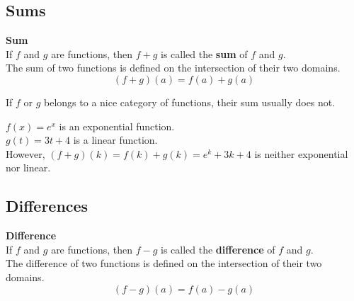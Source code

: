 \documentclass{ximera}
\begin{document}
\subsection*{Sums}


\begin{template}  \textbf{\textcolor{blue!55!black}{Sum}} \\


If  $f$ and $g$ are functions, then $f + g$ is called the \textbf{\textcolor{green!50!black}{sum}} of $f$ and $g$. \\

The sum of two functions is defined on the intersection of their two domains. \\


\[ (f + g)(a) = f(a) + g(a)  \]



\end{template}



\begin{warning}

If $f$ or $g$ belongs to a nice category of functions, their sum usually does not.

\end{warning}




\begin{example}

$f(x) = e^x$ is an exponential function. \\
$g(t) = 3 t + 4$ is a linear function. \\

However, $(f + g)(k) = f(k) + g(k) = e^k + 3 k + 4$ is neither exponential nor linear.

\end{example}








\subsection*{Differences}



\begin{template}  \textbf{\textcolor{blue!55!black}{Difference}} \\


If  $f$ and $g$ are functions, then $f - g$ is called the \textbf{\textcolor{green!50!black}{difference}} of $f$ and $g$. \\

The difference of two functions is defined on the intersection of their two domains. \\


\[ (f - g)(a) = f(a) - g(a)  \]



\end{template}
\end{document}

